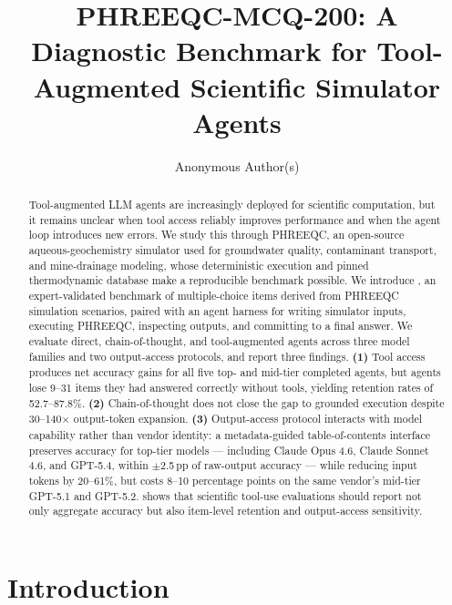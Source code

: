 \documentclass{article}
\title{PHREEQC-MCQ-200: A Diagnostic Benchmark for Tool-Augmented Scientific Simulator Agents}
\author{Anonymous Author(s)}
\begin{document}
\maketitle

\begin{abstract}
Tool-augmented LLM agents are increasingly deployed for scientific computation, but it remains unclear when tool access reliably improves performance and when the agent loop introduces new errors. We study this through PHREEQC, an open-source aqueous-geochemistry simulator used for groundwater quality, contaminant transport, and mine-drainage modeling, whose deterministic execution and pinned thermodynamic database make a reproducible benchmark possible. We introduce \BenchName, an expert-validated benchmark of \BenchN{} multiple-choice items derived from \BenchScenarioN{} PHREEQC simulation scenarios, paired with an agent harness for writing simulator inputs, executing PHREEQC, inspecting outputs, and committing to a final answer. We evaluate direct, chain-of-thought, and tool-augmented agents across three model families and two output-access protocols, and report three findings. \textbf{(1)} Tool access produces net accuracy gains for all five top- and mid-tier completed agents, but agents lose 9--31 items they had answered correctly without tools, yielding retention rates of 52.7--87.8\%. \textbf{(2)} Chain-of-thought does not close the gap to grounded execution despite 30--140$\times$ output-token expansion. \textbf{(3)} Output-access protocol interacts with model capability rather than vendor identity: a metadata-guided table-of-contents interface preserves accuracy for top-tier models --- including Claude Opus 4.6, Claude Sonnet 4.6, and GPT-5.4, within $\pm$2.5\,pp of raw-output accuracy --- while reducing input tokens by 20--61\%, but costs 8--10 percentage points on the same vendor's mid-tier GPT-5.1 and GPT-5.2. \BenchName{} shows that scientific tool-use evaluations should report not only aggregate accuracy but also item-level retention and output-access sensitivity.
\end{abstract}

\section{Introduction}
\end{document}
